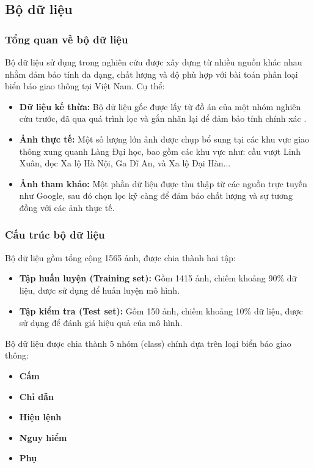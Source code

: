 \documentclass[a4paper,12pt]{article}
\begin{document}
\subsection{Bộ dữ liệu}

\subsubsection{Tổng quan về bộ dữ liệu}
Bộ dữ liệu sử dụng trong nghiên cứu được xây dựng từ nhiều nguồn khác nhau nhằm đảm bảo tính đa dạng, chất lượng và độ phù hợp với bài toán phân loại biển báo giao thông tại Việt Nam. Cụ thể:  
\begin{itemize}
    \item \textbf{Dữ liệu kế thừa:} Bộ dữ liệu gốc được lấy từ đồ án của một nhóm nghiên cứu trước, đã qua quá trình lọc và gắn nhãn lại để đảm bảo tính chính xác \cite{roboflow_vietnam_traffic_signs}. 
    \item \textbf{Ảnh thực tế:} Một số lượng lớn ảnh được chụp bổ sung tại các khu vực giao thông xung quanh Làng Đại học, bao gồm các khu vực như: cầu vượt Linh Xuân, dọc Xa lộ Hà Nội, Ga Dĩ An, và Xa lộ Đại Hàn...
    \item \textbf{Ảnh tham khảo:} Một phần dữ liệu được thu thập từ các nguồn trực tuyến như Google, sau đó chọn lọc kỹ càng để đảm bảo chất lượng và sự tương đồng với các ảnh thực tế.
\end{itemize}

\subsubsection{Cấu trúc bộ dữ liệu}
Bộ dữ liệu gồm tổng cộng 1565 ảnh, được chia thành hai tập:
\begin{itemize}
    \item \textbf{Tập huấn luyện (Training set):} Gồm 1415 ảnh, chiếm khoảng 90\% dữ liệu, được sử dụng để huấn luyện mô hình.
    \item \textbf{Tập kiểm tra (Test set):} Gồm 150 ảnh, chiếm khoảng 10\% dữ liệu, được sử dụng để đánh giá hiệu quả của mô hình.
\end{itemize}

Bộ dữ liệu được chia thành 5 nhóm (class) chính dựa trên loại biển báo giao thông:
\begin{itemize}
    \item \textbf{Cấm}
    \item \textbf{Chỉ dẫn}
    \item \textbf{Hiệu lệnh}
    \item \textbf{Nguy hiểm}
    \item \textbf{Phụ}
\end{itemize}
\end{document}
